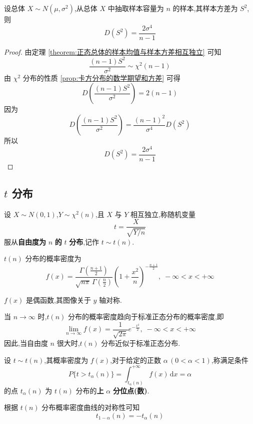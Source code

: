 \begin{theorem}
    设总体 $X \sim N(\mu,\sigma^2)$,从总体 $X$ 中抽取样本容量为 $n$ 的样本,其样本方差为 $S^2$,则
    $$
    D(S^2) = \dfrac{2 \sigma^4}{n-1}
    $$
\end{theorem}

\begin{proof}
    由定理 \ref{theorem:正态总体的样本均值与样本方差相互独立} 可知
    $$
    \dfrac{(n-1) S^2}{\sigma^2} \sim \chi^2(n-1)
    $$
    由 $\chi^2$ 分布的性质 \ref*{prop:卡方分布的数学期望和方差} 可得
    $$
    D \left( \dfrac{(n-1) S^2}{\sigma^2} \right) = 2(n-1)
    $$
    因为
    $$
    D \left( \dfrac{(n-1) S^2}{\sigma^2} \right) = \dfrac{(n-1)^2}{\sigma^4} D(S^2)
    $$
    所以
    $$
    D(S^2) = \dfrac{2 \sigma^4}{n-1}
    $$
\end{proof}

\subsection{\texorpdfstring{$t$}{} 分布}

\begin{definition} \label{def:t分布}
    设 $X \sim N(0,1)$,$Y \sim \chi^2(n)$,且 $X$ 与 $Y$ 相互独立,称随机变量
    $$
    t = \dfrac{X}{\sqrt{Y/n}}
    $$
    服从\textbf{自由度为} $n$ \textbf{的} $t$ \textbf{分布},记作 $t \sim t(n)$.
\end{definition}

$t(n)$ 分布的概率密度为
$$
f(x) = \dfrac{\Gamma(\frac{n+1}{2})}{\sqrt{n \pi} \, \Gamma(\frac{n}{2})} \left( 1 + \dfrac{x^2}{n} \right)^{-\frac{n+1}{2}}, \; -\infty < x < +\infty
$$

$f(x)$ 是偶函数,其图像关于 $y$ 轴对称.

当 $n \to \infty$ 时,$t(n)$ 分布的概率密度趋向于标准正态分布的概率密度,即
$$
\lim_{n \to \infty} f(x) = \dfrac{1}{\sqrt{2 \pi}} e^{-\frac{x^2}{2}}, \; -\infty < x < +\infty
$$
因此,当自由度 $n$ 很大时,$t(n)$ 分布近似于标准正态分布.

\begin{definition}
    设 $t \sim t(n)$,其概率密度为 $f(x)$,对于给定的正数 $\alpha \, (0 < \alpha < 1)$,称满足条件
    $$
    P \{ t > t_{\alpha}(n) \} = \int_{t_{\alpha}(n)}^{+\infty} f(x) \, \text{d}x = \alpha
    $$
    的点 $t_{\alpha}(n)$ 为 $t(n)$ 分布的\textbf{上} $\alpha$ \textbf{分位点(数)}.
\end{definition}

根据 $t(n)$ 分布概率密度曲线的对称性可知
$$
t_{1 - \alpha}(n) = -t_{\alpha}(n)
$$

